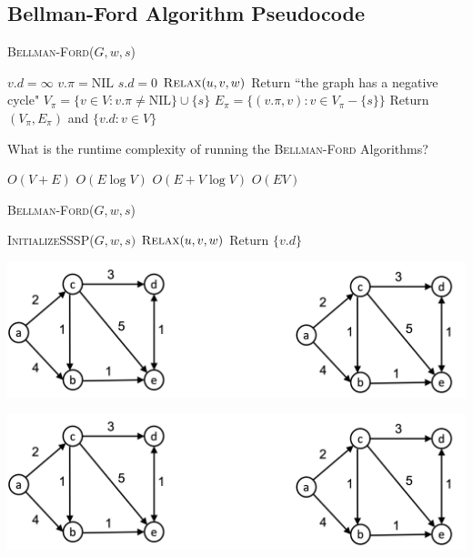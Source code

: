 \documentclass[11  pt]{exam}
\begin{document}
	\newpage
	\subsection{Bellman-Ford Algorithm Pseudocode}
	
	\begin{algorithm}
		\textsc{Bellman-Ford}($G,w,s$)
		\begin{algorithmic}
			\State $v.d = \infty$
			\State $v.\pi = \text{NIL}$
			\EndFor
			\State $s.d = 0$
			\State 
			\State $\textsc{Relax}(u,v,w)$
			\EndFor
			\EndFor
			\State 
			\State Return ``the graph has a negative cycle"
			\EndIf
			\EndFor
			\State
			\State $V_\pi = \{ v \in V \colon v.\pi \neq \text{NIL}\} \cup \{s\}$
			\State $E_\pi = \{(v.\pi, v) \colon v \in V_\pi - \{s\}\}$
			\State Return $(V_\pi, E_\pi)$ and $\{v.d \colon v \in V\}$
		\end{algorithmic}
	\end{algorithm}
	
	\begin{Qu}
		What is the runtime complexity of running the \textsc{Bellman-Ford} Algorithms?
		\begin{itemize}
			\aitem $O(V + E)$
			\bitem $O(E \log V)$
			\citem $O(E + V \log V)$
			\ditem $O(EV)$
		\end{itemize}
	\end{Qu}
	
	\newpage
	
	\begin{algorithm}[t]
		\textsc{Bellman-Ford}($G,w,s$)
		\begin{algorithmic}
			\State \textsc{InitializeSSSP}($G,w,s)$
			\For{$i = 1$ to $|V| - 1$}
			\For{$ (u,v) \in E$}
			\State $\textsc{Relax}(u,v,w)$
			\EndFor
			\EndFor
			\State Return $\{v.d\}$
		\end{algorithmic}
	\end{algorithm}
	\includegraphics[width = \linewidth]{twographs.png}
	
	\includegraphics[width = \linewidth]{twographs.png}
	
\end{document}
